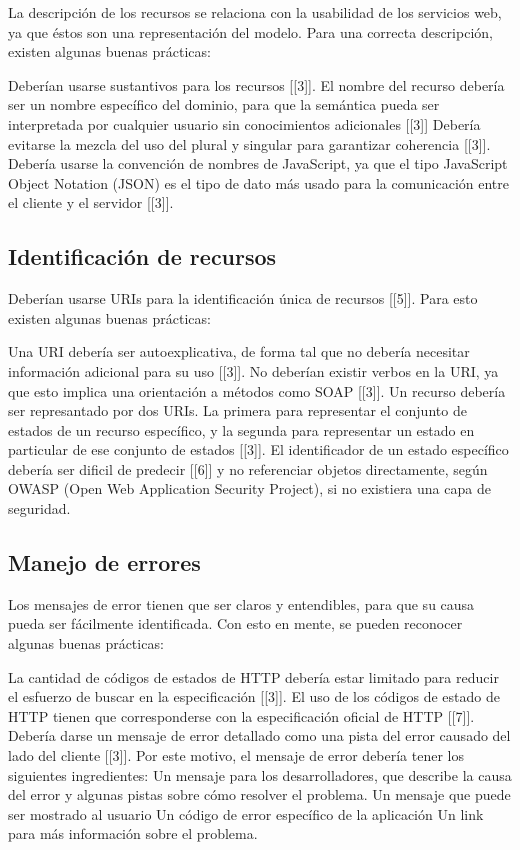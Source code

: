 La descripción de los recursos se relaciona con la usabilidad de los servicios web, ya que éstos son una representación del modelo. Para una correcta descripción, existen algunas buenas prácticas:
\begin{outline}
    \1 Deberían usarse sustantivos para los recursos [[3]].
    \1 El nombre del recurso debería ser un nombre específico del dominio, para que la semántica pueda ser interpretada por cualquier usuario sin conocimientos adicionales [[3]]
    \1 Debería evitarse la mezcla del uso del plural y singular para garantizar coherencia [[3]].
    \1 Debería usarse la convención de nombres de JavaScript, ya que el tipo JavaScript Object Notation (JSON) es el tipo de dato más usado para la comunicación entre el cliente y el servidor [[3]].
\end{outline}
\subsection[Identificación de recursos]{Identificación de recursos}

Deberían usarse URIs para la identificación única de recursos [[5]]. Para esto existen algunas buenas prácticas:
\begin{outline}
    \1 Una URI debería ser autoexplicativa, de forma tal que no debería necesitar información adicional para su uso [[3]].
    \1 No deberían existir verbos en la URI, ya que esto implica una orientación a métodos como SOAP [[3]].
    \1 Un recurso debería ser represantado por dos URIs. La primera para representar el conjunto de estados de un recurso específico, y la segunda para representar un estado en particular de ese conjunto de estados [[3]].
    \1 El identificador de un estado específico debería ser dificil de predecir [[6]] y no referenciar objetos directamente, según OWASP (Open Web Application Security Project), si no existiera una capa de seguridad.
\end{outline}

\subsection[Manejo de errores]{Manejo de errores}

Los mensajes de error tienen que ser claros y entendibles, para que su causa pueda ser fácilmente identificada. Con esto en mente, se pueden reconocer algunas buenas prácticas:
\begin{outline}
    \1 La cantidad de códigos de estados de HTTP debería estar limitado para reducir el esfuerzo de buscar en la especificación [[3]].
    \1 El uso de los códigos de estado de HTTP tienen que corresponderse con la especificación oficial de HTTP [[7]].
    \1 Debería darse un mensaje de error detallado como una pista del error causado del lado del cliente [[3]]. Por este motivo, el mensaje de error debería tener los siguientes ingredientes:
        \2 Un mensaje para los desarrolladores, que describe la causa del error y algunas pistas sobre cómo resolver el problema.
        \2 Un mensaje que puede ser mostrado al usuario
        \2 Un código de error específico de la aplicación
        \2 Un link para más información sobre el problema.
\end{outline}
